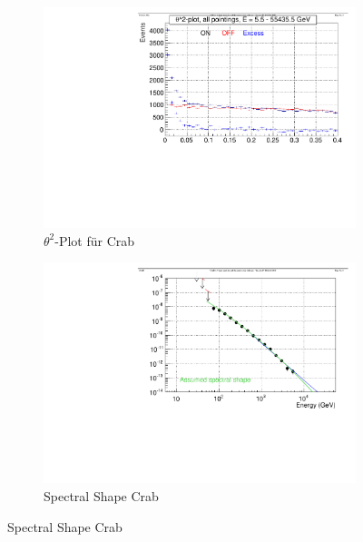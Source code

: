 \begin{figure}
  \begin{subfigure}{0.45\linewidth}
  \includegraphics[width=\textwidth]{./Plots/04_MrkAnalyse/Datenset2/Theta_Quadrat.pdf}
  \caption{$\theta^2$-Plot für Crab}
  \label{Datenset2_theta^2_Crab}
  \end{subfigure}
  \hfill
  \begin{subfigure}{0.45\linewidth}
  \includegraphics[width=\textwidth]{./Plots/04_MrkAnalyse/Datenset2/SpectralShape.pdf}
  \caption{Spectral Shape Crab}
  \label{Datenset2_SpectralShape_Crab}
  \end{subfigure}

\end{figure}
